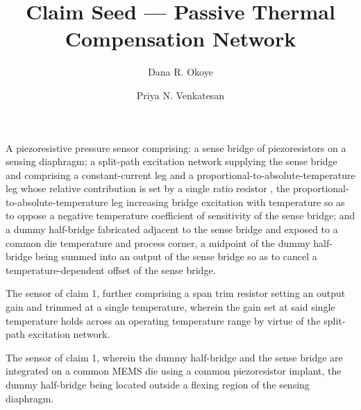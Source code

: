 \documentclass{anvil-uspto}
\title{Claim Seed --- Passive Thermal Compensation Network}
\author{Dana R. Okoye \and Priya N. Venkatesan}
\begin{document}
\begin{claims}

\begin{claim}
A piezoresistive pressure sensor comprising:
a sense bridge  of piezoresistors on a sensing diaphragm;
a split-path excitation network  supplying the sense bridge and
comprising a constant-current leg and a proportional-to-absolute-temperature
leg whose relative contribution is set by a single ratio resistor ,
the proportional-to-absolute-temperature leg increasing bridge excitation with
temperature so as to oppose a negative temperature coefficient of sensitivity of
the sense bridge; and
a dummy half-bridge  fabricated adjacent to the sense bridge and
exposed to a common die temperature and process corner, a midpoint of the dummy
half-bridge being summed into an output of the sense bridge so as to cancel a
temperature-dependent offset of the sense bridge.
\end{claim}

\begin{claim}
The sensor of claim 1, further comprising a span trim resistor 
setting an output gain and trimmed at a single temperature, wherein the gain set
at said single temperature holds across an operating temperature range by virtue
of the split-path excitation network.
\end{claim}

\begin{claim}
The sensor of claim 1, wherein the dummy half-bridge  and the sense
bridge  are integrated on a common MEMS die using a common
piezoresistor implant, the dummy half-bridge being located outside a flexing
region of the sensing diaphragm.
\end{claim}

\end{claims}
\end{document}
